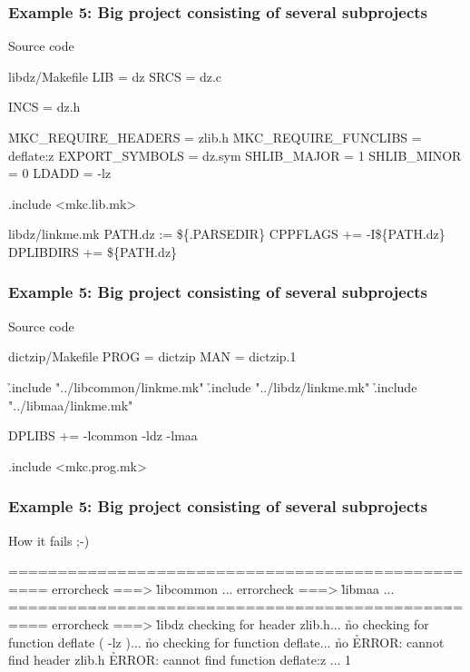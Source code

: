 \documentclass[hyperref={colorlinks=true}]{beamer}
\begin{document}
\begin{frame}[fragile]
  \frametitle{Example 5: Big project consisting of several subprojects}

  \begin{block}{Source code}
  \begin{Code}{libdz/Makefile}
LIB =            dz
SRCS =           dz.c

INCS =           dz.h

\h{MKC\_REQUIRE\_HEADERS} =    zlib.h
\h{MKC\_REQUIRE\_FUNCLIBS} =   deflate:z
EXPORT_SYMBOLS =         dz.sym
SHLIB_MAJOR =            1
SHLIB_MINOR =            0
LDADD =                  -lz

.include <mkc.lib.mk>
  \end{Code}
  \begin{Code}{libdz/linkme.mk}
PATH.dz :=       \$\{.PARSEDIR\}
CPPFLAGS +=      -I\$\{PATH.dz\}
DPLIBDIRS +=     \$\{PATH.dz\}
  \end{Code}
  \end{block}
\end{frame}

\begin{frame}[fragile]
  \frametitle{Example 5: Big project consisting of several subprojects}

  \begin{block}{Source code}
  \begin{Code}{dictzip/Makefile}
PROG =   dictzip
MAN =    dictzip.1

\h{.include} "../libcommon/linkme.mk"
\h{.include} "../libdz/linkme.mk"
\h{.include} "../libmaa/linkme.mk"

DPLIBS +=        -lcommon -ldz -lmaa

.include <mkc.prog.mk>
  \end{Code}
  \end{block}
\end{frame}

\begin{frame}[fragile]
  \frametitle{Example 5: Big project consisting of several subprojects}

  \begin{block}{How it fails ;-)}
  \begin{CodeNoLabel}
==================================================
errorcheck ===> \h{libcommon}
...
errorcheck ===> \h{libmaa}
...
==================================================
errorcheck ===> \h{libdz}
checking for header zlib.h... \h{no}
checking for function deflate ( -lz )... \h{no}
checking for function deflate... \h{no}
\h{ERROR: cannot find header zlib.h}
\h{ERROR: cannot find function deflate:z}
...
1
\prompt{\$}
  \end{CodeNoLabel}
  \end{block}
\end{frame}
\end{document}

